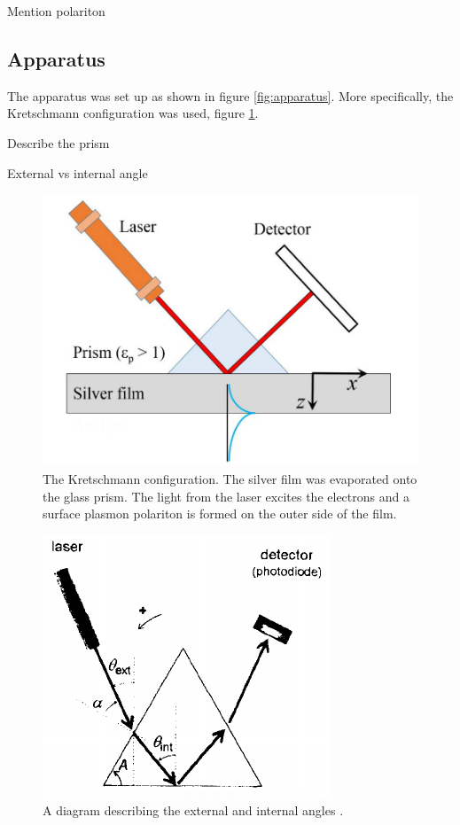 \documentclass[%
reprint,
amsmath,amssymb,
aps,
]{revtex4-2}
\begin{document}
			Mention polariton
		
		\subsection{Apparatus}
			The apparatus was set up as shown in figure \ref{fig:apparatus}. More specifically, the Kretschmann configuration was used, figure \ref{fig:kConfig}.
			
			
			Describe the prism
			
			External vs internal angle
			\begin{figure}
				\includegraphics[width=0.9\columnwidth]{kConfig.png}
				\caption{\label{fig:kConfig}The Kretschmann configuration. The silver film was evaporated onto the glass prism. The light from the laser excites the electrons and a surface plasmon polariton is formed on the outer side of the film. \cite{opticalApplications}}
			\end{figure}
		
			\begin{figure}
				\includegraphics[width=0.7\columnwidth]{anglesDiagram.png}
				\caption{\label{fig:angles}A diagram describing the external and internal angles \cite{pluchery}.}
			\end{figure}
	 
\end{document}
